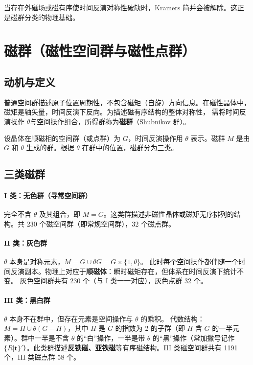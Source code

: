 当存在外磁场或磁有序使时间反演对称性破缺时，Kramers 简并会被解除。这正是磁群分类的物理基础。

\section{磁群（磁性空间群与磁性点群）}

\subsection{动机与定义}
普通空间群描述原子位置周期性，不包含磁矩（自旋）方向信息。在磁性晶体中，磁矩是轴矢量，时间反演下反向。为描述磁有序结构的整体对称性，
需将时间反演操作 $\theta$与空间操作组合，所得群称为\textbf{磁群}（Shubnikov 群）。

设晶体在顺磁相的空间群（或点群）为 $G$，时间反演操作用 $\theta$ 表示。磁群 $M$ 是由 $G$ 和 $\theta$ 生成的群。根据 $\theta$ 在群中的位置，磁群分为三类。

\subsection{三类磁群}

\paragraph{I 类：无色群（寻常空间群）}
完全不含 $\theta$ 及其组合，即 $M = G$。这类群描述非磁性晶体或磁矩无序排列的结构。共 230 个磁空间群（即常规空间群），32 个磁点群。

\paragraph{II 类：灰色群}
$\theta$ 本身是对称元素，$M = G \cup \theta G = G \times \{1,\theta\}$。
此时每个空间操作都伴随一个时间反演副本。物理上对应于\textbf{顺磁体}：瞬时磁矩存在，但体系在时间反演下统计不变。
灰色空间群共有 230 个（与 I 类一一对应），灰色点群 32 个。

\paragraph{III 类：黑白群}
$\theta$ 本身不在群中，但存在元素是空间操作与 $\theta$ 的乘积。
代数结构：$M = H \cup \theta(G-H)$，其中 $H$ 是 $G$ 的指数为 2 的子群（即 $H$ 含 $G$ 的一半元素）。群中一半是不含 $\theta$ 的“白”操作，一半是带 $\theta$ 的“黑”操作（常加撇号记作 $\{R|\mathbf{t}\}'$）。此类群描述\textbf{反铁磁、亚铁磁}等有序磁结构。III 类磁空间群共有 1191 个，III 类磁点群 58 个。

